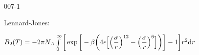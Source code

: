 \begin{mitframe}{007-1}
\begin{listone}
\begin{listtwo}
\begin{listthree}
    		\item Lennard-Jones:
            
            \begin{listfour}
    
    			\item $\virialcoeff{2}(\Temp) = -2\pie\av\int\limits_{0}^{\infty}\bigg[\exp\bigg[-\boltznorm\bigg(4\welldepth\Big[\Big(\dfrac{\molecrad}{\pos}\Big)^{12}-\Big(\dfrac{\molecrad}{\pos}\Big)^6\Big]\bigg)\bigg]-1\bigg]\pos^2\mathrm{d}\pos$
    
    
    		\end{listfour}
    
    	\end{listthree}
    
    \end{listtwo}
    
\end{listone}
    
\end{mitframe}